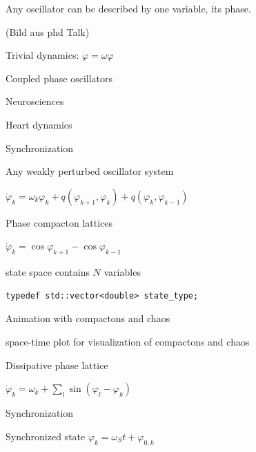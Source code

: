 \begin{frame}

 Any oscillator can be described by one variable, its phase.

 (Bild aus phd Talk)

 Trivial dynamics: $\dot{\varphi}=\omega \varphi$

\end{frame}




\begin{frame}

 Coupled phase oscillators

 Neurosciences

 Heart dynamics

 Synchronization

 Any weakly perturbed oscillator system

 $\dot{\varphi}_k = \omega_k \varphi_k + q( \varphi_{k+1} , \varphi_k ) + q( \varphi_k , \varphi_{k-1} )$

\end{frame}




\begin{frame}[fragile]
 
 Phase compacton lattices

 $\dot{\varphi}_k = \cos \varphi_{k+1} - \cos \varphi_{k-1}$

 state space contains $N$ variables

 \begin{lstlisting}
typedef std::vector<double> state_type;
 \end{lstlisting}

 Animation with compactons and chaos

 space-time plot for visualization of compactons and chaos

\end{frame}





\begin{frame}[fragile]

Dissipative phase lattice

$\dot{\varphi}_k = \omega_k + \sum\limits_l \sin( \varphi_l - \varphi_k )$

Synchronization

Synchronized state $\varphi_k = \omega_S t + \varphi_{0,k} $

\end{frame}









